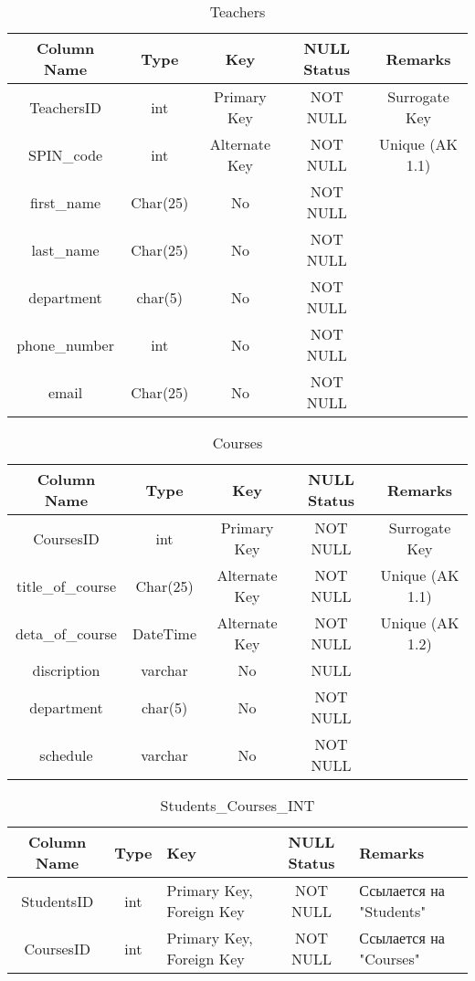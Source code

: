 \documentclass[a4paper, 14pt]{extarticle}
\begin{document}
\begin{table}[H]
\centering
\captionsetup{singlelinecheck=false, justification=raggedright}
\caption{Teachers}
    \begin{tabular}
        {|c|c|c|c|c|}
        \hline
        Column Name & Type & Key & NULL Status  & Remarks \\
        \hline
        TeachersID & int & Primary Key & NOT NULL & Surrogate Key \\
        \hline
        SPIN\_code & int & Alternate Key & NOT NULL & Unique (AK 1.1) \\
        \hline
        first\_name & Char(25) & No & NOT NULL &  \\
        \hline
        last\_name & Char(25) & No & NOT NULL &  \\
        \hline
        department & char(5) & No & NOT NULL &  \\
        \hline
        phone\_number & int & No & NOT NULL &  \\
        \hline
        email & Char(25) & No & NOT NULL &  \\
    \hline
    \end{tabular}
\end{table}

\begin{table}[H]
\centering
\captionsetup{singlelinecheck=false, justification=raggedright}
\caption{Courses}
    \begin{tabular}
        {|c|c|c|c|c|}
        \hline
        Column Name & Type & Key & NULL Status  & Remarks \\
        \hline
        CoursesID & int & Primary Key & NOT NULL & Surrogate Key \\
        \hline
        title\_of\_course & Char(25) & Alternate Key & NOT NULL & Unique (AK 1.1) \\
        \hline
        deta\_of\_course & DateTime & Alternate Key & NOT NULL & Unique (AK 1.2) \\
        \hline
        discription & varchar & No & NULL &  \\
        \hline
        department & char(5) & No & NOT NULL &  \\
        \hline
        schedule & varchar & No & NOT NULL &  \\
    \hline
    \end{tabular}
\end{table}

\begin{table}[H]
\centering
\captionsetup{singlelinecheck=false, justification=raggedright}
\caption{Students\_Courses\_INT}
    \begin{tabular}
        {|c|c|p{3cm}|c|p{3cm}|}
        \hline
        Column Name & Type & Key & NULL Status  & Remarks \\
        \hline
        StudentsID & int & Primary Key, Foreign Key & NOT NULL & Ссылается на "Students" \\
        \hline
        CoursesID & int & Primary Key, Foreign Key & NOT NULL & Ссылается на "Courses" \\
    \hline
    \end{tabular}
\end{table}
\end{document}
